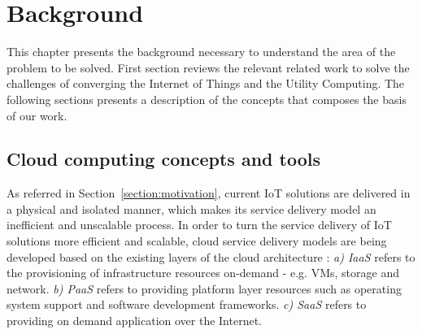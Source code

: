 
\chapter{Background}
\label{chapter:background}
This chapter presents the background necessary to understand the area of the problem to be solved.
First section reviews the relevant related work to solve the challenges of converging the Internet
of Things and the Utility Computing. The following sections presents a description of the concepts
that composes the basis of our work.

\section{Cloud computing concepts and tools}
\label{sub:cloud_concepts_tools}
As referred in Section~\ref{section:motivation}, current \gls{IoT} solutions are delivered in a physical
and isolated manner, which makes its service delivery model an inefficient and unscalable process.
In order to turn the service delivery of \gls{IoT} solutions more efficient and scalable, cloud service
delivery models are being developed based on the existing layers of the cloud architecture \cite{zhang2010cloud}:
\textit{a) \gls{IaaS}} refers to the provisioning of infrastructure resources on-demand - e.g. \glspl{VM},
storage and network. \textit{b) \gls{PaaS}} refers to providing platform layer resources such as operating
system support and software development frameworks. \textit{c) \gls{SaaS}} refers to providing on demand
application over the Internet.

